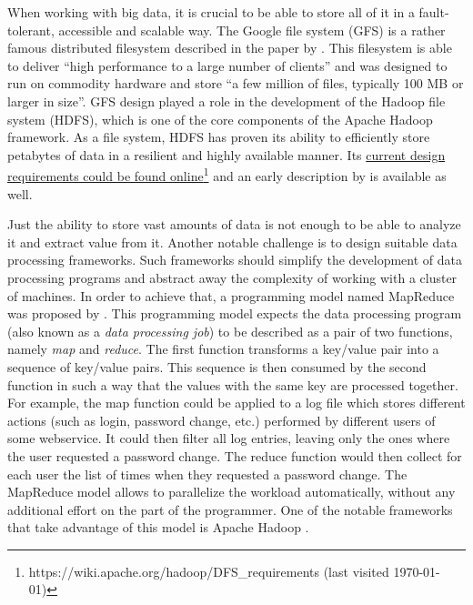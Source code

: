 When working with big data, it is crucial to be able to store all of it in a fault-tolerant, accessible and scalable way. The Google file system (GFS) is a rather famous distributed filesystem described in the paper by \citet{2003-ghemawat-gfs}. This filesystem is able to deliver ``high performance to a large number of clients'' and was designed to run on commodity hardware and store ``a few million of files, typically 100 MB or larger in size''. GFS design played a role in the development of the Hadoop file system (HDFS), which is one of the core components of the Apache Hadoop framework. As a file system, HDFS has proven its ability to efficiently store petabytes of data in a resilient and highly available manner. Its \href{https://wiki.apache.org/hadoop/DFS_requirements}{current design requirements could be found online\footnote{\url{https://wiki.apache.org/hadoop/DFS_requirements} (last visited \today)}} and an early description by \citet{2010-shvachko-hdfs} is available as well.

Just the ability to store vast amounts of data is not enough to be able to analyze it and extract value from it. Another notable challenge is to design suitable data processing frameworks. Such frameworks should simplify the development of data processing programs and abstract away the complexity of working with a cluster of machines. In order to achieve that, a programming model named MapReduce was proposed by \citet{2004-dean-mapreduce}. This programming model expects the data processing program (also known as a \emph{data processing job}) to be described as a pair of two functions, namely \emph{map} and \emph{reduce}. The first function transforms a key/value pair into a sequence of key/value pairs. This sequence is then consumed by the second function in such a way that the values with the same key are processed together. For example, the map function could be applied to a log file which stores different actions (such as login, password change, etc.) performed by different users of some webservice. It could then filter all log entries, leaving only the ones where the user requested a password change. The reduce function would then collect for each user the list of times when they requested a password change. The MapReduce model allows to parallelize the workload automatically, without any additional effort on the part of the programmer. One of the notable frameworks that take advantage of this model is Apache Hadoop \cite{2008-zaharia-hadoop-late}.


